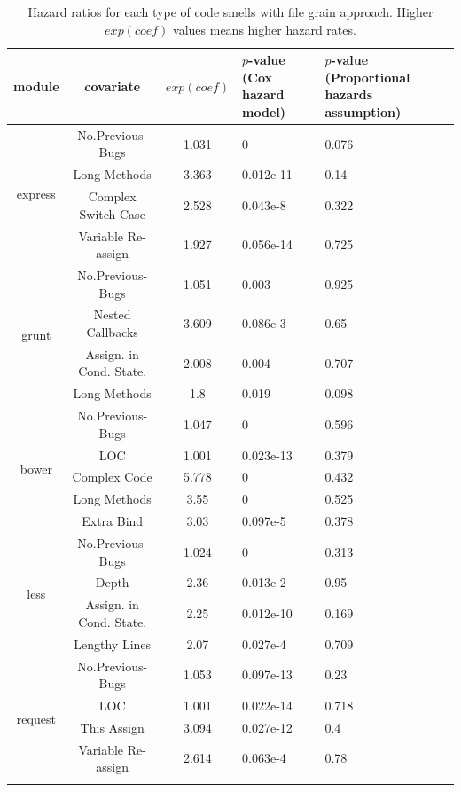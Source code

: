 \begin{table}[!htbp]
\centering
\scriptsize
\caption{Hazard ratios for each type of code smells with file grain approach. Higher $exp(coef)$ values means higher hazard rates.}
\begin{tabular}{c|c|c|p{2cm}|p{2cm}}
\hline
module & covariate & $exp(coef)$ & $p$-value (Cox hazard model) & $p$-value (Proportional hazards assumption) \\ \hline
\multirow{4}{*}{express}
 & No.Previous-Bugs & 1.031 & 0 & 0.076 \\ \cline{2-5}
 & Long Methods & 3.363 & 0.012e-11 & 0.14 \\ \cline{2-5}
 & Complex Switch Case & 2.528 & 0.043e-8 & 0.322 \\ \cline{2-5}
 & Variable Re-assign & 1.927 & 0.056e-14 & 0.725  \\ \hline
\multirow{4}{*}{grunt} 
 & No.Previous-Bugs & 1.051 & 0.003 & 0.925 \\ \cline{2-5}
 & Nested Callbacks & 3.609 & 0.086e-3 & 0.65 \\ \cline{2-5}
 & Assign. in Cond. State. & 2.008 & 0.004 & 0.707 \\ \cline{2-5}
 & Long Methods & 1.8 & 0.019 & 0.098 \\ \hline
\multirow{5}{*}{bower}
 & No.Previous-Bugs & 1.047 & 0 & 0.596 \\ \cline{2-5}
 & LOC & 1.001 & 0.023e-13 & 0.379 \\ \cline{2-5}
 & Complex Code & 5.778 & 0 & 0.432 \\ \cline{2-5}
 & Long Methods & 3.55 & 0 & 0.525 \\ \cline{2-5}
 & Extra Bind & 3.03 & 0.097e-5 & 0.378 \\ \hline
\multirow{4}{*}{less}
 & No.Previous-Bugs & 1.024 & 0 & 0.313 \\ \cline{2-5}
 & Depth & 2.36 & 0.013e-2 & 0.95 \\ \cline{2-5}
 & Assign. in Cond. State. & 2.25 & 0.012e-10 & 0.169 \\ \cline{2-5}
 & Lengthy Lines & 2.07 & 0.027e-4 & 0.709 \\ \hline
\multirow{5}{*}{request}
 & No.Previous-Bugs & 1.053 & 0.097e-13 & 0.23 \\ \cline{2-5}
 & LOC & 1.001 & 0.022e-14 & 0.718 \\ \cline{2-5}
 & This Assign & 3.094 & 0.027e-12 & 0.4 \\ \cline{2-5}
 & Variable Re-assign & 2.614 & 0.063e-4 & 0.78 \\ \cline{2-5}

\end{tabular}
\end{table}
